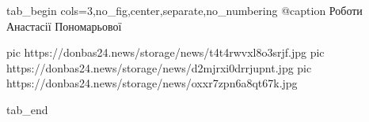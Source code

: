  
 
 
 
 


\ifcmt
  tab_begin cols=3,no_fig,center,separate,no_numbering
    @caption Роботи Анастасії Пономарьової

     pic https://donbas24.news/storage/news/t4t4rwvxl8o3srjf.jpg
     pic https://donbas24.news/storage/news/d2mjrxi0drrjupnt.jpg
     pic https://donbas24.news/storage/news/oxxr7zpn6a8qt67k.jpg

  tab_end
\fi
